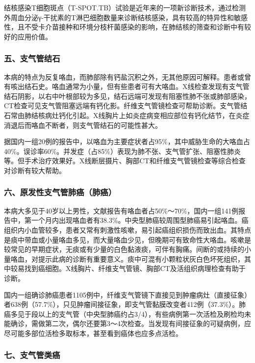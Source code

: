 结核感染T细胞斑点（T-SPOT.TB）试验是近年来的一项新诊断技术，通过检测外周血分泌γ-干扰素的T淋巴细胞数量来诊断结核感染，具有较高的特异性和敏感性，且不受卡介苗接种和环境分枝杆菌感染的影响，在肺结核的筛查和诊断中有较好的应用价值。

\subsubsection{五、支气管结石}

本病的特点为反复咯血，而肺部除有钙盐沉积之外，无其他原因可解释。患者或曾有咳出结石史。咯血通常为小量，但有些患者可有大咯血。X线检查发现有支气管结石阴影，以右中叶根部较为多见，结石远端可发现有阻塞性肺不张或肺部感染，CT检查可见支气管阻塞远端有钙化影。纤维支气管镜检查可帮助诊断。支气管结石常由肺结核病灶钙化引起。X线胸片上如炎症病变相应部位有钙化结节，在炎症消退后而咯血不断者，则支气管结石的可能性甚大。

据国内一组20例的报告中，以咯血为主要症状者占95\%，其中威胁生命的大咯血占40\%。误诊率60\%。并发症（占85\%）表现为肺不张、支气管扩张、阻塞性肺炎等。但手术治疗效果好。X线断层摄片、胸部CT和纤维支气管镜检查等综合检查对诊断有较大帮助。

\subsubsection{六、原发性支气管肺癌（肺癌）}

本病大多见于40岁以上男性，文献报告有咯血者占50\%～70\%，国内一组141例报告中，第一个月内出现咯血者有38.3\%。中央型肺癌较周围型肺癌易引起咯血。癌组织内小血管较多，患者又常有刺激性咳嗽，易引起癌组织损伤而致出血。其特点是痰中带血或小量咯血多见，而大量咯血少见，但晚期可有致命性大咯血。咳嗽是较常见的早期症状，无痰或有少量的白色黏液痰，可伴有胸痛。间断的或持续的小量咯血，对提示此病的诊断有重要意义。痰中可混有小颗粒状灰白色坏死组织，其中较易找到癌细胞。X线胸片、纤维支气管镜、胸部CT及活组织病理检查有助于诊断。

国内一组确诊肺癌患者1105例中，纤维支气管镜下直接见到肿瘤病灶（直接征象）者638例（57.7\%），只见肿瘤间接征象，即支气管黏膜改变者412例（37.3\%）。肺癌多见于段以上的支气管（中央型肺癌约占3/4），有些病例第一次活检及刷检均未能确诊，需做第二次，偶尔还要第3～4次检查。当发现有间接征象的可疑病例，应尽可能多部位活检多取标本，甚至看到癌体也应多点活检。

\subsubsection{七、支气管类癌}

